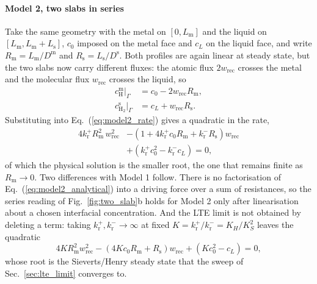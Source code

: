 \documentclass[5p]{elsarticle}
\newcommand{\cm}[1]{c^{\mathrm{m}}_{#1}}   %
\newcommand{\cs}[1]{c^{\mathrm{s}}_{#1}}   %
\begin{document}
\paragraph{Model 2, two slabs in series} Take the same geometry with the metal on $[0, L_\mathrm{m}]$ and the liquid on $[L_\mathrm{m}, L_\mathrm{m} + L_\mathrm{s}]$, $c_0$ imposed on the metal face and $c_L$ on the liquid face, and write $R_\mathrm{m} = L_\mathrm{m}/D^{\mathrm{m}}$ and $R_\mathrm{s} = L_\mathrm{s}/D^{\mathrm{s}}$.
Both profiles are again linear at steady state, but the two slabs now carry different fluxes: the atomic flux $2w_\mathrm{rec}$ crosses the metal and the molecular flux $w_\mathrm{rec}$ crosses the liquid, so
\begin{equation}
    \begin{aligned}
        \cm{\mathrm{H}}\big|_\Gamma &= c_0 - 2w_\mathrm{rec}R_\mathrm{m} , \\[3pt]
        \cs{\mathrm{H_2}}\big|_\Gamma &= c_L + w_\mathrm{rec}R_\mathrm{s} .
    \end{aligned}
    \label{eq:two_slab_traces_2}
\end{equation}
Substituting into Eq.~(\ref{eq:model2_rate}) gives a quadratic in the rate,
\begin{equation}
    \begin{split}
        4k_\mathrm{r}^{+}R_\mathrm{m}^{2}\,w_\mathrm{rec}^{2}
        &- \left(1 + 4k_\mathrm{r}^{+}c_0R_\mathrm{m}
                  + k_\mathrm{r}^{-}R_\mathrm{s}\right)w_\mathrm{rec} \\
        &+ \left(k_\mathrm{r}^{+}c_0^{2} - k_\mathrm{r}^{-}c_L\right) = 0 ,
    \end{split}
    \label{eq:model2_analytical}
\end{equation}
of which the physical solution is the smaller root, the one that remains finite as $R_\mathrm{m} \rightarrow 0$.
Two differences with Model 1 follow.
There is no factorisation of Eq.~(\ref{eq:model2_analytical}) into a driving force over a sum of resistances, so the series reading of Fig.~\ref{fig:two_slab}b holds for Model 2 only after linearisation about a chosen interfacial concentration.
And the LTE limit is not obtained by deleting a term: taking $k_\mathrm{r}^{+},k_\mathrm{r}^{-} \rightarrow \infty$ at fixed $K = k_\mathrm{r}^{+}/k_\mathrm{r}^{-} = K_H/K_S^{2}$ leaves the quadratic
\begin{equation}
    4KR_\mathrm{m}^{2}w_\mathrm{rec}^{2}
    - \left(4Kc_0R_\mathrm{m} + R_\mathrm{s}\right)w_\mathrm{rec}
    + \left(Kc_0^{2} - c_L\right) = 0 ,
    \label{eq:model2_lte_quadratic}
\end{equation}
whose root is the Sieverts/Henry steady state that the sweep of Sec.~\ref{sec:lte_limit} converges to.
\end{document}
